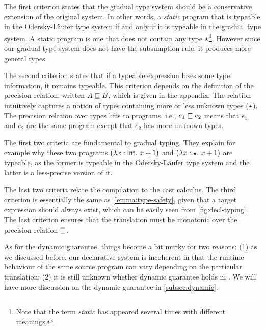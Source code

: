 The first criterion states that the gradual type system should be a conservative
extension of the original system. In other words, a \textit{static} program that
is typeable in the Odersky-L{\"a}ufer type system if and only if it is typeable
in the gradual type system. A static program is one that does not contain any
type $\star$\footnote{Note that the term \textit{static} has appeared several
  times with different meanings.}. However since our gradual type system does
not have the subsumption rule, it produces more general types.

The second criterion states that if a typeable expression loses some type
information, it remains typeable. This criterion depends on the definition of
the precision relation, written $A \sqsubseteq B$, which is given in the appendix.
The relation intuitively captures a notion of types containing more or less
unknown types ($\star$). The precision relation over types lifts to programs,
i.e., $e_1 \sqsubseteq e_2$ means that $e_1$ and $e_2$ are the same program except
that $e_2$ has more unknown types.

The first two criteria are fundamental to gradual typing. They explain for
example why these two programs $(\lambda x:\mathsf{Int}.~ {x + 1})$ and $(\lambda x:\star.~
{x + 1})$ are typeable, as the former is typeable in the Odersky-L{\"a}ufer type
system and the latter is a less-precise version of it.

The last two criteria relate the compilation to the cast calculus. The third
criterion is essentially the same as \cref{lemma:type-safety}, given that a
target expression should always exist, which can be easily seen from
\cref{fig:decl-typing}. The last criterion ensures that the translation must be
monotonic over the precision relation $\sqsubseteq$.

As for the dynamic guarantee, things become a bit murky for two reasons: (1) as
we discussed before, our declarative system is incoherent in that the runtime
behaviour of the same source program can vary depending on the particular
translation; (2) it is still unknown whether dynamic guarantee holds in \pbc. We
will have more discussion on the dynamic guarantee in \cref{subsec:dynamic}.







